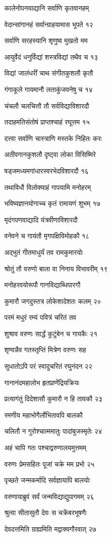कालेनोपनयाद्यानि सर्वाणि कृतवानहम्

वेदान्सांगानहं सर्वान्ग्राहयामास भूपते १२

सर्वाणि सरहस्यानि शृणुष्व मुखतो मम

आयुर्वेदं धनुर्विद्यां शस्त्रविद्यां तथैव च १३

विद्यां जालंधरीं चाथ संगीतकुशलौ कृतौ

गंगाकूले गायमानौ लताकुंजवनेषु च १४

चंचलौ चलचित्तौ तौ सर्वविद्याविशारदौ

तदाहमतिसंतोषं प्राप्तश्चाहं रघूत्तम १५

दत्त्वा सर्वाणि चास्त्राणि मस्तके निहितः करः

अतीवगानकुशलौ दृष्ट्वा लोका विसिष्मिरे

षड्जमध्यमगांधारस्वरभेदविशारदौ १६

तथाविधौ विलोक्याहं गापयामि मनोहरम्

भविष्यज्ञानयोगाच्च कृतं रामायणं शुभम् १७

मृदंगपणवाद्यादि यंत्रवीणाविशारदौ

वनेवने च गायंतौ मृगपक्षिविमोहकौ १८

अद्भुतं गीतमाधुर्यं तव रामकुमारयोः

श्रोतुं तौ वरुणो बाला वा निनाय विभावरीम् १९

मनोहरवयोरूपौ गानविद्याब्धिपारगौ

कुमारौ जगदुस्तत्र लोकेशादेशतः कलम् २०

परमं मधुरं रम्यं पवित्रं चरितं तव

शुश्राव वरुणः सार्द्धं कुटुंबेन च गायकैः २१

शृण्वन्नैव गतस्तृप्तिं मित्रेण वरुणः सह

सुधातोऽपि परं स्वादुचरितं रघुनंदन २२

गानानंदमहालोभ हृतप्राणेंद्रियक्रियः

प्रत्यागंतुं दिदेशासौ कुमारौ न हि तावकौ २३

रमणीय महाभोगैर्लोभितावपि बालकौ

चलितौ न गुरोश्चात्ममातुः पादांबुजस्मृतेः २४

अहं चापि गतः पश्चाद्वरुणालयमुत्तमम्

वरुणः प्रेमसहितः पूजां चक्रे मम प्रभो २५

पृच्छते जन्मकर्मादि सर्वज्ञायापि बालयोः

वरुणायाब्रुवं सर्वं जन्मविद्याद्युपागमम् २६

श्रुत्वा सीतासुतौ देवः स चक्रेंबरभूषणैः

देवदत्तमिति ग्राह्यमिति मद्वाक्यगौरवात् २७

